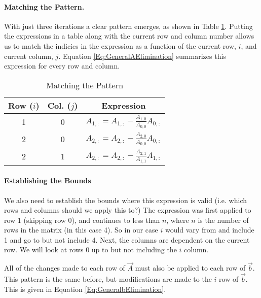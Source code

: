 \documentclass{../../KDHnotes}
\begin{document}

\paragraph{Matching the Pattern.} 
With just three iterations a clear pattern emerges, as shown in Table \ref{Tab:PatternMatch}. Putting the expressions in a table along with the current row and column number allows us to match the indicies in the expression as a function of the current row, $i$, and current column, $j$.
Equation \ref{Eq:GeneralAElimination} summarizes this expression for every row and column. 

\begin{table}[h!]
\centering
\caption{Matching the Pattern}
\label{Tab:PatternMatch}
\begin{tabular}{|c|c|c|}
\hline 
Row ($i$) & Col. ($j$) & Expression \\ 
\hline 
1 & 0 & $\displaystyle A_{1,:} = A_{1, :} - \frac{A_{1,0}} {A_{0,0}} A_{0,:}$ \\ 
\hline 
2 & 0 & $\displaystyle 	A_{2,:} = A_{2, :} - \frac{A_{2,0}} {A_{0,0}} A_{0,:}$ \\ 
\hline 
2 & 1 & $\displaystyle 	A_{2,:} = A_{2, :} - \frac{A_{2,1}} {A_{1,1}} A_{1,:}$ \\
\hline
\end{tabular} 
\end{table}




\paragraph{Establishing the Bounds}
We also need to establish the bounds where this expression is valid (i.e. which rows and columns should we apply this to?) The expression was first applied to row 1 (skipping row 0), and continues to less than $n$, where $n$ is the number of rows in the matrix (in this case 4). So in our case $i$ would vary from and include 1 and go to but not include 4. Next, the columns are dependent on the current row. We will look at rows 0 up to but not including the $i$ column. 






All of the changes made to each row of $\vec{A}$ must also be applied to each row of $\vec{b}$. This pattern is the same before, but modifications are made to the $i$ row of $\vec{b}$. This is given in Equation \ref{Eq:GeneralbElimination}.
\end{document}
